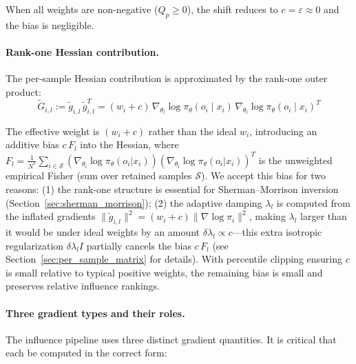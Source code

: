 \documentclass{article}
\begin{document}
When all weights are non-negative ($Q_p \ge 0$), the shift reduces to $c = \varepsilon \approx 0$ and the bias is negligible.

\paragraph{Rank-one Hessian contribution.}
The per-sample Hessian contribution is approximated by the rank-one outer product:
\begin{equation}
    \tilde{G}_{i,l} := \tilde{g}_{i,l}\,\tilde{g}_{i,l}^T = (w_i+c)\,\nabla_{\theta_l}\log\pi_\theta(o_i\!\mid\! x_i)\,\nabla_{\theta_l}\log\pi_\theta(o_i\!\mid\! x_i)^T
\end{equation}

The effective weight is $(w_i+c)$ rather than the ideal $w_i$, introducing an additive bias $c\,F_l$ into the Hessian, where $F_l = \frac{1}{N^*}\sum_{i\in\mathcal{S}}(\nabla_{\theta_l}\log\pi_\theta(o_i|x_i))(\nabla_{\theta_l}\log\pi_\theta(o_i|x_i))^T$ is the unweighted empirical Fisher (sum over retained samples $\mathcal{S}$).
We accept this bias for two reasons: (1) the rank-one structure is essential for Sherman--Morrison inversion (Section~\ref{sec:sherman_morrison}); (2) the adaptive damping $\lambda_l$ is computed from the inflated gradients $\|\tilde{g}_{i,l}\|^2 = (w_i+c)\|\nabla\log\pi_i\|^2$, making $\lambda_l$ larger than it would be under ideal weights by an amount $\delta\lambda_l \propto c$---this extra isotropic regularization $\delta\lambda_l I$ partially cancels the bias $c\,F_l$ (see Section~\ref{sec:per_sample_matrix} for details).
With percentile clipping ensuring $c$ is small relative to typical positive weights, the remaining bias is small and preserves relative influence rankings.

\paragraph{Three gradient types and their roles.}
The influence pipeline uses three distinct gradient quantities.
It is critical that each be computed in the correct form:
\end{document}
